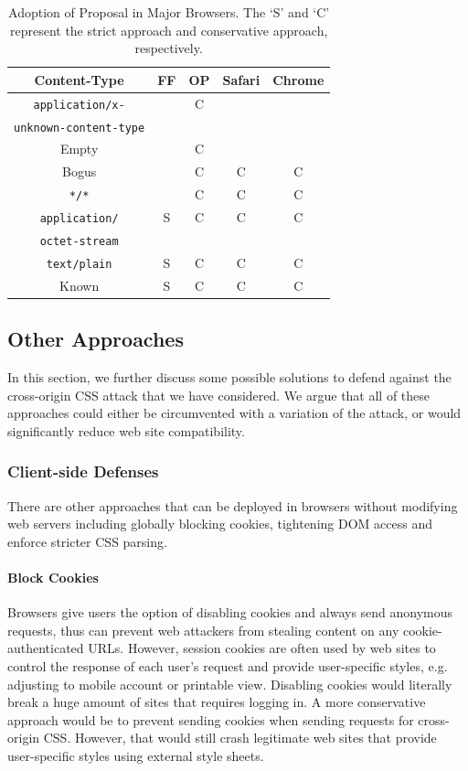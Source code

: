 \documentclass{acm_proc_article-sp}
\begin{document}
\begin{table}
\centering
\begin{tabular}{|c|c|c|c|c|} \hline
Content-Type&FF&OP&Safari&Chrome\\ \hline
\texttt{application/x-}&&C&&\\ 
\texttt{unknown-content-type}&&&&\\ \hline
Empty&&C&&\\ \hline
Bogus&&C&C&C \\ \hline
\texttt{*/*}&&C&C&C \\ \hline
\texttt{application/}&S&C&C&C\\ 
\texttt{octet-stream}&&&&\\ \hline
\texttt{text/plain}&S&C&C&C\\ \hline
Known&S&C&C&C\\
\hline\end{tabular}
\caption{Adoption of Proposal in Major Browsers. The `S' and `C' represent the strict approach and conservative approach, respectively.}
\label{table:adoption}
\end{table}

\subsection{Other Approaches}
In this section, we further discuss some possible solutions to defend against the cross-origin CSS attack that we have considered. We argue that all of these approaches could either be circumvented with a variation of the attack, or would significantly reduce web site compatibility.

\subsubsection{Client-side Defenses}
There are other approaches that can be deployed in browsers without modifying web servers including globally blocking cookies, tightening DOM access and enforce stricter CSS parsing.

\paragraph{Block Cookies}
Browsers give users the option of disabling cookies and always send anonymous requests, thus can prevent web attackers from stealing content on any cookie-authenticated URLs. However, session cookies are often used by web sites to control the response of each user's request and provide user-specific styles, e.g. adjusting to mobile account or printable view. Disabling cookies would literally break a huge amount of sites that requires logging in. A more conservative approach would be to prevent sending cookies when sending requests for cross-origin CSS. However, that would still crash legitimate web sites that provide user-specific styles using external style sheets.
\end{document}
